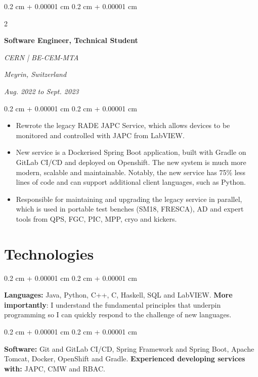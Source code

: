 \documentclass[10pt, letterpaper]{article}
\newenvironment{highlights}{
    \begin{itemize}[
        topsep=0.10 cm,
        parsep=0.10 cm,
        partopsep=0pt,
        itemsep=0pt,
        leftmargin=0.4 cm + 10pt
    ]
}{
    \end{itemize}
} %
\newenvironment{onecolentry}{
    \begin{adjustwidth}{
        0.2 cm + 0.00001 cm
    }{
        0.2 cm + 0.00001 cm
    }
}{
    \end{adjustwidth}
} %
\newenvironment{twocolentry}[2][]{
    \onecolentry
    \def\secondColumn{#2}
    \setcolumnwidth{\fill, 4.5 cm}
    \begin{paracol}{2}
}{
    \switchcolumn \raggedleft \secondColumn
    \end{paracol}
    \endonecolentry
} %
\begin{document}
        \vspace{0.2 cm-3px}

        \begin{twocolentry}{
        \textit{Meyrin, Switzerland}    
            
        \textit{Aug. 2022 to Sept. 2023}}
            \textbf{Software Engineer, Technical Student}
            
            \textit{CERN | BE-CEM-MTA}
        \end{twocolentry}

        \vspace{0.10 cm-3px}
        \begin{onecolentry}
            \begin{highlights}
                \item Rewrote the legacy RADE JAPC Service, which allows devices to be monitored and controlled with JAPC from LabVIEW.
                \item New service is a Dockerised Spring Boot application, built with Gradle on GitLab CI/CD and deployed on Openshift. The new system is much more modern, scalable and maintainable. Notably, the new service has 75\% less lines of code and can support additional client languages, such as Python. 
                \item Responsible for maintaining and upgrading the legacy service in parallel, which is used in portable test benches (SM18, FRESCA), AD and expert tools from QPS, FGC, PIC, MPP, cryo and kickers. 
            \end{highlights}
        \end{onecolentry}



    
    \section{Technologies}



        
        \begin{onecolentry}
            \textbf{Languages:} Java, Python, C++, C, Haskell, SQL and LabVIEW. \textbf{More importantly}: I understand the fundamental principles that underpin programming so I can quickly respond to the challenge of new languages. 
        \end{onecolentry}

        \vspace{0.2 cm}

        \begin{onecolentry}
            \textbf{Software:} Git and GitLab CI/CD, Spring Framework and Spring Boot, Apache Tomcat, Docker, OpenShift and Gradle. \textbf{Experienced developing services with:} JAPC, CMW and RBAC.
        \end{onecolentry}
\end{document}
